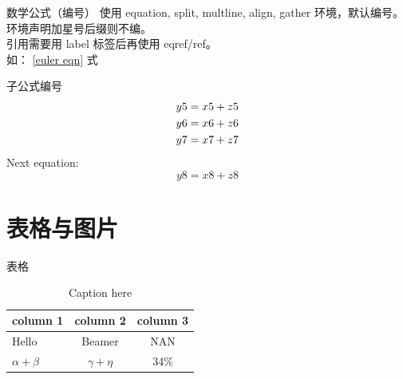 \documentclass[UTF8,14pt,aspectratio=43,dvipsnames,svgnames,x11names,hyperref={urlcolor=blue}]{beamer}
\begin{document}
\begin{frame}{数学公式（编号）}
	使用 equation, split, multline, align, gather 环境，默认编号。环境声明加星号后缀则不编。\\
	引用需要用 label 标签后再使用 eqref/ref。\\
	如： \eqref{euler eqn} 式
\end{frame}

\begin{frame}{子公式编号}
	\begin{subequations}
		\begin{align}
			y5=x5+z5 \label{Za}\\
			y6=x6+z6 \notag \\
			y7=x7+z7 \label{Zb}
		\end{align}
	\end{subequations}
	Next equation:
	\begin{equation}
		y8=x8+z8 \label{WW}
	\end{equation}
\end{frame}

\section[表格与图片]{表格与图片}
\begin{frame}{表格}
	\begin{table}[t]  
		\centering
		\caption{Caption here\label{tab:tablename}}
		\begin{tabular}{l|cc} \hline  
			\textbf{column 1} & \textbf{column 2} & \textbf{column 3} \\ \hline
			Hello & Beamer & NAN \\ \hline
			$\alpha+\beta$ & $\gamma+\eta$ & 34\% \\ \hline
		\end{tabular}
	\end{table}
\end{frame}
\end{document}
